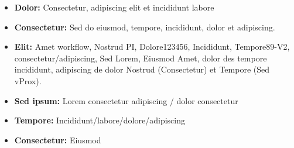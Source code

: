 \twocolumnsection
{
	\vspace{1em}
	\begin{itemize}
		\item \textbf{Dolor:} Consectetur, adipiscing elit et incididunt labore
		\item \textbf{Consectetur:} Sed do eiusmod, tempore, incididunt, dolor et adipiscing.
		\item \textbf{Elit:} Amet workflow, Nostrud PI, Dolore123456, Incididunt, Tempore89-V2, consectetur/adipiscing, Sed Lorem, Eiusmod Amet, dolor des tempore incididunt, adipiscing de dolor Nostrud (Consectetur) et Tempore (Sed vProx).
\end{itemize}}
{
	\vspace{1em}
	\begin{itemize}
		\item \textbf{Sed ipsum:} Lorem consectetur adipiscing / dolor consectetur
		\item \textbf{Tempore:} Incididunt/labore/dolore/adipiscing
		\item \textbf{Consectetur:} Eiusmod
	\end{itemize}
}
